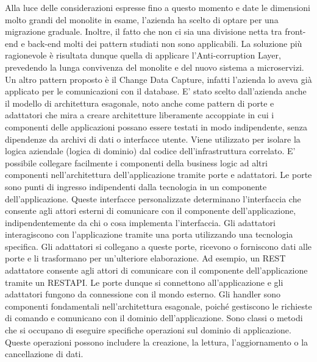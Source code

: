         Alla luce delle considerazioni espresse fino a questo momento e date le dimensioni molto grandi del monolite in esame, l'azienda ha scelto di optare per una migrazione graduale. Inoltre, il fatto che non ci sia una divisione netta tra front-end e back-end molti dei pattern studiati non sono applicabili. La soluzione più ragionevole è risultata dunque quella di applicare l'Anti-corruption Layer, prevedendo la lunga convivenza del monolite e del nuovo sistema a microservizi. Un altro pattern proposto è il Change Data Capture, infatti l'azienda lo aveva già applicato per le comunicazioni con il database. E' stato scelto dall'azienda anche il modello di architettura esagonale, noto anche come pattern di porte e adattatori che mira a creare architetture liberamente accoppiate in cui i componenti delle applicazioni possano essere testati in modo indipendente, senza dipendenze da archivi di dati o interfacce utente. Viene utilizzato per isolare la logica aziendale (logica di dominio) dal codice dell'infrastruttura correlato. E' possibile collegare facilmente i componenti della business logic ad altri componenti nell'architettura dell'applicazione tramite porte e adattatori. Le porte sono punti di ingresso indipendenti dalla tecnologia in un componente dell'applicazione. Queste interfacce personalizzate determinano l'interfaccia che consente agli attori esterni di comunicare con il componente dell'applicazione, indipendentemente da chi o cosa implementa l'interfaccia. Gli adattatori interagiscono con l'applicazione tramite una porta utilizzando una tecnologia specifica. Gli adattatori si collegano a queste porte, ricevono o forniscono dati alle porte e li trasformano per un'ulteriore elaborazione. Ad esempio, un REST adattatore consente agli attori di comunicare con il componente dell'applicazione tramite un RESTAPI. Le porte dunque si connettono all'applicazione e gli adattatori fungono da connessione con il mondo esterno. Gli handler sono componenti fondamentali nell'architettura esagonale, poiché gestiscono le richieste di comando e comunicano con il dominio dell'applicazione. Sono classi o metodi che si occupano di eseguire specifiche operazioni sul dominio di applicazione. Queste operazioni possono includere la creazione, la lettura, l'aggiornamento o la cancellazione di dati.

